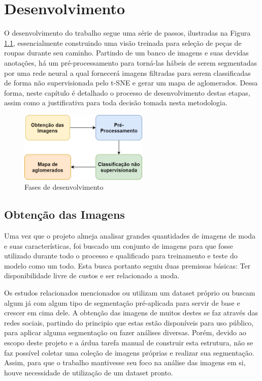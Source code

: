 \documentclass[12pt]{report}
\begin{document}
\chapter{Desenvolvimento}

O desenvolvimento do trabalho segue uma série de passos, ilustradas na Figura \ref{fig:metodo}, essencialmente construindo uma visão treinada para seleção de peças de roupas durante seu caminho. Partindo de um banco de imagens e suas devidas anotações, há um pré-processamento para torná-las hábeis de serem segmentadas por uma rede neural a qual fornecerá imagens filtradas para serem classificadas de forma não supervisionada pelo t-SNE e gerar um mapa de aglomerados. Dessa forma, neste capítulo é detalhado o processo de desenvolvimento destas etapas, assim como a justificativa para toda decisão tomada nesta metodologia. 

\begin{figure}
    \centering
    \includegraphics[width=0.55\textwidth]{images/metodo.png}
    \caption{Fases de desenvolvimento}
    \label{fig:metodo}
\end{figure}

\section{Obtenção das Imagens}

Uma vez que o projeto almeja analisar grandes quantidades de imagens de moda e suas características, foi buscado um conjunto de imagens para que fosse utilizado durante todo o processo e qualificado para treinamento e teste do modelo como um todo. Esta busca portanto seguiu duas premissas básicas: Ter disponibilidade livre de custos e ser relacionado a moda. 

Os estudos relacionados mencionados ou utilizam um dataset próprio ou buscam algum já com algum tipo de segmentação pré-aplicada para servir de base e crescer em cima dele. A obtenção das imagens de muitos destes se faz através das redes sociais, partindo do principio que estas estão disponíveis para uso público, para aplicar alguma segmentação ou fazer análises diversas. Porém, devido ao escopo deste projeto e a árdua tarefa manual de construir esta estrutura, não se faz possível coletar uma coleção de imagens próprias e realizar sua segmentação. Assim, para que o trabalho mantivesse seu foco na análise das imagens em si, houve necessidade de utilização de um dataset pronto. 
\end{document}
